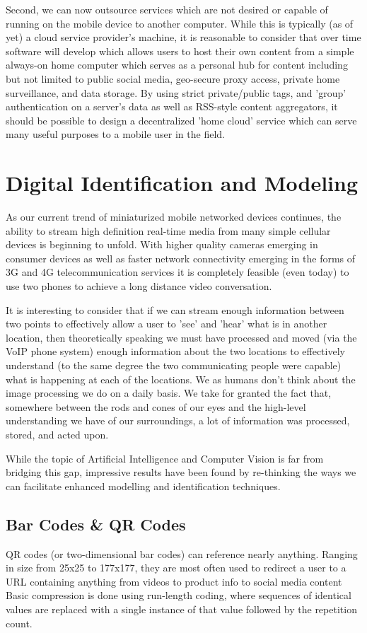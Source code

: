 \documentclass[a4paper,12pt]{report}
\begin{document}
Second, we can now outsource services which are not desired or capable of running on the mobile device to another computer. While this is typically (as of yet) a cloud service provider's machine, it is reasonable to consider that over time software will develop which allows users to host their own content from a simple always-on home computer which serves as a personal hub for content including but not limited to public social media, geo-secure proxy access, private home surveillance, and data storage. By using strict private/public tags, and 'group' authentication on a server's data as well as RSS-style content aggregators, it should be possible to design a decentralized 'home cloud' service which can serve many useful purposes to a mobile user in the field.
\iffalse
\section{Digital Identification and Modeling}

As our current trend of miniaturized mobile networked devices continues, the ability to stream high definition real-time media from many simple cellular devices is beginning to unfold. With higher quality cameras emerging in consumer devices as well as faster network connectivity emerging in the forms of 3G and 4G telecommunication services it is completely feasible (even today) to use two phones to achieve a long distance video conversation.

It is interesting to consider that if we can stream enough information between two points to effectively allow a user to 'see' and 'hear' what is in another location, then theoretically speaking we must have processed and moved (via the VoIP phone system) enough information about the two locations to effectively understand (to the same degree the two communicating people were capable) what is happening at each of the locations. We as humans don't think about the image processing we do on a daily basis. We take for granted the fact that, somewhere between the rods and cones of our eyes and the high-level understanding we have of our surroundings, a lot of information was processed, stored, and acted upon.

While the topic of Artificial Intelligence and Computer Vision is far from bridging this gap, impressive results have been found by re-thinking the ways we can facilitate enhanced modelling and identification techniques.

\subsection{Bar Codes \& QR Codes}
QR codes (or two-dimensional bar codes) can reference nearly anything. Ranging in size from 25x25 to 177x177, they are most often used to redirect a user to a URL containing anything from videos to product info to social media content \cite{6182398}
Basic compression is done using run-length coding, where sequences of identical values are replaced with a single instance of that value followed by the repetition count. \cite{6182398}
\end{document}
